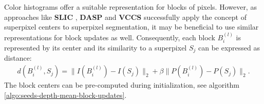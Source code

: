 Color histograms offer a suitable representation for blocks of pixels. However, as approaches like \textbf{SLIC} \cite{AchantaShajiSmithLucchiFuaSuesstrunk:2010}, \textbf{DASP} and \textbf{VCCS} successfully apply the concept of superpixel centers to superpixel segmentation, it may be beneficial to use similar representations for block updates as well. Consequently, each block $B_i^{(l)}$ is represented by its center and its similarity to a superpixel $S_j$ can be expressed as distance:
\begin{align}
	\label{eq:seeds-depth-mean-block-updates-distance}
	d(B_i^{(l)}, S_j) = \|I(B_i^{(l)}) - I(S_j)\|_2 + \beta\|P(B_i^{(l)}) - P(S_j)\|_2.
\end{align}
The block centers can be pre-computed during initialization, see algorithm \ref{algo:seeds-depth-mean-block-updates}.

